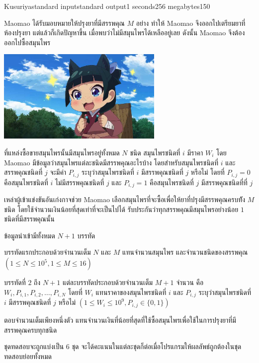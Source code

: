 \documentclass[11pt,a4paper]{article}
\begin{document}
\begin{problem}{Kusuriya}{standard input}{standard output}{1 seconds}{256 megabytes}{150}

Maomao ได้รับมอบหมายให้ปรุงยาที่มีสรรพคุณ $M$ อย่าง ทำให้ Maomao จึงออกไปเตรียมยาที่ห้องปรุงยา แต่แล้วก็เกิดปัญหาขึ้น เมื่อพบว่าไม่มีสมุนไพรได้เหลืออยู่เลย ดังนั้น Maomao จึงต้องออกไปซื้อสมุนไพร 

\begin{center}
    \includegraphics[width=8cm]{kusuriya/Kusuriya-no-Hitorigoto-01-03-06.jpg}
\end{center}

ที่แหล่งซื้อขายสมุนไพรนั้นมีสมุนไพรอยู่ทั้งหมด $N$ ชนิด สมุนไพรชนิดที่ $i$ มีราคา $W_i$ โดย Maomao มีข้อมูลว่าสมุนไพรแต่ละชนิดมีสรรพคุณอะไรบ้าง โดยสำหรับสมุนไพรชนิดที่ $i$ และสรรพคุณชนิดที่ $j$ จะมีค่า $P_{i,j}$ ระบุว่าสมุนไพรชนิดที่ $i$ มีสรรพคุณชนิดที่ $j$ หรือไม่ โดยที่ $P_{i,j}=0$ คือสมุนไพรชนิดที่ $i$ ไม่มีสรรพคุณชนิดที่ $j$ และ $P_{i,j}=1$ คือสมุนไพรชนิดที่ $j$ มีสรรพคุณชนิดที่ที่ $j$

เหล่าผู้เข้าแข่งขันอันเก่งกาจช่วย Maomao เลือกสมุนไพรที่จะซื้อเพื่อให้ยาที่ปรุงมีสรรพคุณครบท้ัง $M$ ชนิด โดยใช้จำนวนเงินน้อยที่สุดเท่าที่จะเป็นไปได้ รับประกันว่าทุกสรรพคุณมีสมุนไพรอย่างน้อย $1$ ชนิดที่มีสรรพคุณนั้น

\InputFile
ข้อมูลนำเข้ามีทั้งหมด $N+1$ บรรทัด

บรรทัดแรกประกอบด้วยจำนวนเต็ม $N$ และ $M$ แทนจำนวนสมุนไพร และจำนวนชนิดของสรรพคุณ $(1\leq N\leq 10^{5},1\leq M\leq 16)$

บรรทัดที่ $2$ ถึง $N+1$ แต่ละบรรทัดประกอบด้วยจำนวนเต็ม $M+1$ จำนวน คือ $W_i,P_{i,1},P_{i,2},\ldots,P_{i,N}$ โดยที่ $W_i$ แทนราคาของสมุนไพรชนิดที่ $i$ และ $P_{i,j}$ ระบุว่าสมุนไพรชนิดที่ $i$ มีสรรพคุณชนิดที่ $j$ หรือไม่ $(1\leq W_i\leq 10^9,P_{i,j}\in\{0,1\})$

\OutputFile
ตอบจำนวนเต็มเพียงหนึ่งตัว แทนจำนวนเงินที่น้อยที่สุดที่ใช้ซื้อสมุนไพรเพื่อใช้ในการปรุงยาที่มีสรรพคุณครบทุกชนิด

\Scoring
ชุดทดสอบจะถูกแบ่งเป็น 6 ชุด จะได้คะแนนในแต่ละชุดก็ต่อเมื่อโปรแกรมให้ผลลัพธ์ถูกต้องในชุดทดสอบย่อยทั้งหมด


\end{problem}
\end{document}
